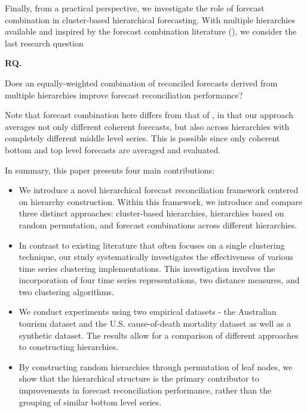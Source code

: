 \documentclass[a4paper,review,12pt,authoryear]{elsarticle}
\newcounter{researchquestion}
\newenvironment{researchquestion}{%
    \refstepcounter{researchquestion}%
    \par\medskip\noindent%
    \textbf{RQ\theresearchquestion.}~%
}{\medskip}
\begin{document}
Finally, from a practical perspective, we investigate the role of forecast combination in cluster-based hierarchical forecasting. With multiple hierarchies available and inspired by the forecast combination literature (\citealp{wangForecastCombinations50year2022}), we consider the last research question

\begin{researchquestion}
    Does an equally-weighted combination of reconciled forecasts derived from multiple hierarchies improve forecast reconciliation performance?
\end{researchquestion}

Note that forecast combination here differs from that of \cite{hollymanUnderstandingForecastReconciliation2021}, in that our approach averages not only different coherent forecasts, but also across hierarchies with completely different middle level series. This is possible since only coherent bottom and top level forecasts are averaged and evaluated.


In summary, this paper presents four main contributions:

\begin{itemize}
  \item We introduce a novel hierarchical forecast reconciliation framework centered on hierarchy construction.  Within this framework, we introduce and compare three distinct approaches: cluster-based hierarchies, hierarchies based on random permutation, and  forecast combinations across different hierarchies.
  \item In contrast to existing literature that often focuses on a single clustering technique, our study systematically investigates the effectiveness of various time series clustering implementations. This investigation involves the incorporation of four time series representations, two distance measures, and two clustering algorithms.
  \item We conduct experiments using two empirical datasets - the Australian tourism dataset and the U.S. cause-of-death mortality dataset as well as a synthetic dataset. The results allow for a comparison of different approaches to constructing hierarchies.
  \item By constructing random hierarchies through permutation of leaf nodes, we show that the hierarchical structure is the primary contributor to improvements in forecast reconciliation performance, rather than the grouping of similar bottom level series. 

\end{itemize}
\end{document}
